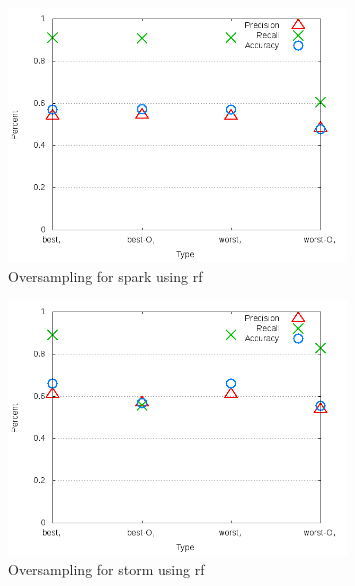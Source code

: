 \begin{figure}[!t]
\centering
\includegraphics[width=0.8\textwidth]{images/rf/test_4/spark_sample_range.png}
\caption{Oversampling for spark using \gls{rf}}
\label{fig:test_4_spark_rf}
\end{figure}

\begin{figure}[!t]
\centering
\includegraphics[width=0.8\textwidth]{images/rf/test_4/storm_sample_range.png}
\caption{Oversampling for storm using \gls{rf}}
\label{fig:test_4_storm_rf}
\end{figure}


